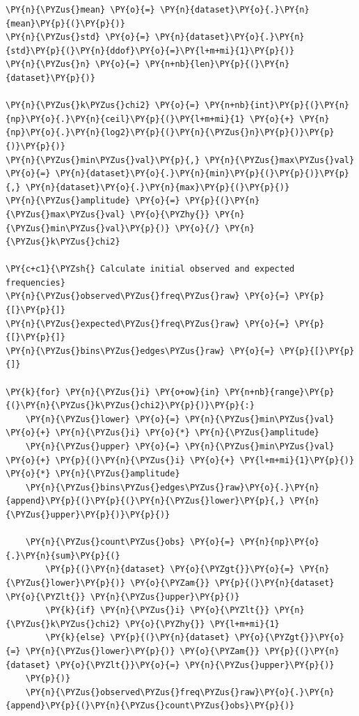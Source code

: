     \begin{tcolorbox}[breakable, size=fbox, boxrule=1pt, pad at break*=1mm,colback=cellbackground, colframe=cellborder]
\begin{Verbatim}[commandchars=\\\{\}]
\PY{n}{\PYZus{}mean} \PY{o}{=} \PY{n}{dataset}\PY{o}{.}\PY{n}{mean}\PY{p}{(}\PY{p}{)}
\PY{n}{\PYZus{}std} \PY{o}{=} \PY{n}{dataset}\PY{o}{.}\PY{n}{std}\PY{p}{(}\PY{n}{ddof}\PY{o}{=}\PY{l+m+mi}{1}\PY{p}{)}
\PY{n}{\PYZus{}n} \PY{o}{=} \PY{n+nb}{len}\PY{p}{(}\PY{n}{dataset}\PY{p}{)}

\PY{n}{\PYZus{}k\PYZus{}chi2} \PY{o}{=} \PY{n+nb}{int}\PY{p}{(}\PY{n}{np}\PY{o}{.}\PY{n}{ceil}\PY{p}{(}\PY{l+m+mi}{1} \PY{o}{+} \PY{n}{np}\PY{o}{.}\PY{n}{log2}\PY{p}{(}\PY{n}{\PYZus{}n}\PY{p}{)}\PY{p}{)}\PY{p}{)}
\PY{n}{\PYZus{}min\PYZus{}val}\PY{p}{,} \PY{n}{\PYZus{}max\PYZus{}val} \PY{o}{=} \PY{n}{dataset}\PY{o}{.}\PY{n}{min}\PY{p}{(}\PY{p}{)}\PY{p}{,} \PY{n}{dataset}\PY{o}{.}\PY{n}{max}\PY{p}{(}\PY{p}{)}
\PY{n}{\PYZus{}amplitude} \PY{o}{=} \PY{p}{(}\PY{n}{\PYZus{}max\PYZus{}val} \PY{o}{\PYZhy{}} \PY{n}{\PYZus{}min\PYZus{}val}\PY{p}{)} \PY{o}{/} \PY{n}{\PYZus{}k\PYZus{}chi2}

\PY{c+c1}{\PYZsh{} Calculate initial observed and expected frequencies}
\PY{n}{\PYZus{}observed\PYZus{}freq\PYZus{}raw} \PY{o}{=} \PY{p}{[}\PY{p}{]}
\PY{n}{\PYZus{}expected\PYZus{}freq\PYZus{}raw} \PY{o}{=} \PY{p}{[}\PY{p}{]}
\PY{n}{\PYZus{}bins\PYZus{}edges\PYZus{}raw} \PY{o}{=} \PY{p}{[}\PY{p}{]}

\PY{k}{for} \PY{n}{\PYZus{}i} \PY{o+ow}{in} \PY{n+nb}{range}\PY{p}{(}\PY{n}{\PYZus{}k\PYZus{}chi2}\PY{p}{)}\PY{p}{:}
    \PY{n}{\PYZus{}lower} \PY{o}{=} \PY{n}{\PYZus{}min\PYZus{}val} \PY{o}{+} \PY{n}{\PYZus{}i} \PY{o}{*} \PY{n}{\PYZus{}amplitude}
    \PY{n}{\PYZus{}upper} \PY{o}{=} \PY{n}{\PYZus{}min\PYZus{}val} \PY{o}{+} \PY{p}{(}\PY{n}{\PYZus{}i} \PY{o}{+} \PY{l+m+mi}{1}\PY{p}{)} \PY{o}{*} \PY{n}{\PYZus{}amplitude}
    \PY{n}{\PYZus{}bins\PYZus{}edges\PYZus{}raw}\PY{o}{.}\PY{n}{append}\PY{p}{(}\PY{p}{(}\PY{n}{\PYZus{}lower}\PY{p}{,} \PY{n}{\PYZus{}upper}\PY{p}{)}\PY{p}{)}

    \PY{n}{\PYZus{}count\PYZus{}obs} \PY{o}{=} \PY{n}{np}\PY{o}{.}\PY{n}{sum}\PY{p}{(}
        \PY{p}{(}\PY{n}{dataset} \PY{o}{\PYZgt{}}\PY{o}{=} \PY{n}{\PYZus{}lower}\PY{p}{)} \PY{o}{\PYZam{}} \PY{p}{(}\PY{n}{dataset} \PY{o}{\PYZlt{}} \PY{n}{\PYZus{}upper}\PY{p}{)}
        \PY{k}{if} \PY{n}{\PYZus{}i} \PY{o}{\PYZlt{}} \PY{n}{\PYZus{}k\PYZus{}chi2} \PY{o}{\PYZhy{}} \PY{l+m+mi}{1}
        \PY{k}{else} \PY{p}{(}\PY{n}{dataset} \PY{o}{\PYZgt{}}\PY{o}{=} \PY{n}{\PYZus{}lower}\PY{p}{)} \PY{o}{\PYZam{}} \PY{p}{(}\PY{n}{dataset} \PY{o}{\PYZlt{}}\PY{o}{=} \PY{n}{\PYZus{}upper}\PY{p}{)}
    \PY{p}{)}
    \PY{n}{\PYZus{}observed\PYZus{}freq\PYZus{}raw}\PY{o}{.}\PY{n}{append}\PY{p}{(}\PY{n}{\PYZus{}count\PYZus{}obs}\PY{p}{)}


\end{Verbatim}
\end{tcolorbox}
